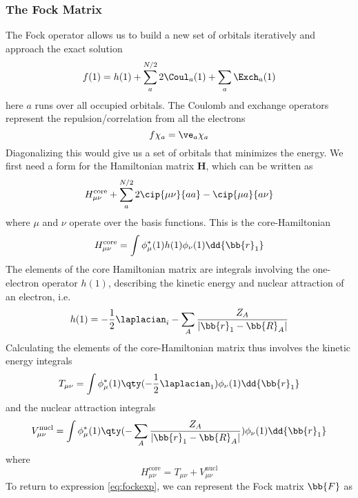 \documentclass[11pt]{article}
\begin{document}
\subsubsection{The Fock Matrix}
The Fock operator allows us to build a new set of orbitals iteratively and approach the exact solution 
\begin{equation}
f(1) = h(1) + \sum_a^{N/2} 2\Coul_a(1)+ \sum_a \Exch_a(1)
\end{equation}
here $a$ runs over all occupied orbitals. The Coulomb and exchange operators represent the repulsion/correlation from all the electrons 
\begin{equation}
f\chi_{a} = \ve_a \chi_{a}
\end{equation}
Diagonalizing this would give us a set of orbitals that minimizes the energy. We first need a form for the Hamiltonian matrix $\mathbf{H}$, which can be written as 
\begin{equation}\label{eq:fockexp}
H_{\mu\nu}^{\text{core}} + \sum_a^{N/2} 2\cip{\mu\nu}{aa} - \cip{\mu a}{a \nu}
\end{equation}
where $\mu$ and $\nu$ operate over the basis functions. This is the core-Hamiltonian
\begin{equation}\label{key}
H_{\mu\nu}^{\text{core}} = \int \phi_\mu^* (1) h(1) \phi_\nu (1) \dd{\bb{r}_1}
\end{equation}
The elements of the core Hamiltonian matrix are integrals involving the one-electron operator $h(1)$, describing the kinetic energy and nuclear attraction of an electron, i.e. 
\begin{equation}\label{key}
h(1) = - \frac{1}{2} \laplacian_i - \sum_A \frac{Z_A}{|\bb{r}_1 - \bb{R}_A|}
\end{equation}
Calculating the elements of the core-Hamiltonian matrix thus involves the kinetic energy integrals 
\begin{equation}\label{key}
T_{\mu\nu} = \int \phi_{\mu}^*(1) \qty(-\frac{1}{2}\laplacian_1) \phi_\nu (1) \dd{\bb{r}_1} 
\end{equation}
and the nuclear attraction integrals
\begin{equation}\label{key}
V_{\mu \nu}^{\text{nucl}} = \int \phi_{\mu}^* (1) \qty(-\sum_A \frac{Z_A}{|\bb{r}_1 - \bb{R}_A|})\phi_\nu (1) \dd{\bb{r}_1} 
\end{equation}
where 
\begin{equation}\label{key}
H_{\mu \nu}^{\text{core}} = T_{\mu\nu} + V_{\mu \nu}^{\text{nucl}}
\end{equation}
To return to expression \eqref{eq:fockexp}, we can represent the Fock matrix $\bb{F}$ as 
\end{document}
